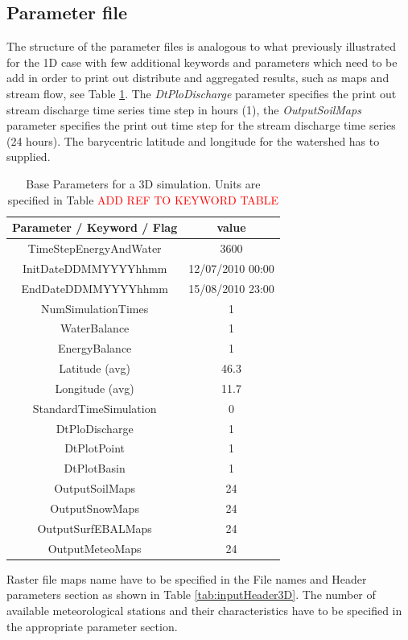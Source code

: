 \subsection{Parameter file}
The structure of the parameter files is analogous to what previously illustrated for the 1D case with few additional keywords and parameters which need to be add in order to print out distribute and aggregated results, such as maps and stream flow, see Table \ref{tab:baseParameters3D}. The { \it DtPloDischarge} parameter specifies the print out stream discharge time series time step in hours (1), the { \it OutputSoilMaps} parameter specifies the print out  time step for the stream discharge time series (24 hours). The barycentric latitude and longitude for the watershed has to supplied.
\begin{table}[h!]
\begin{center}
\begin{tabular}[c]{|c|c|}
\hline
Parameter / Keyword / Flag & value\\
\hline
TimeStepEnergyAndWater& 3600\\
InitDateDDMMYYYYhhmm  & 12/07/2010 00:00 \\
EndDateDDMMYYYYhhmm & 15/08/2010 23:00\\
NumSimulationTimes  & 1\\
WaterBalance & 1\\
EnergyBalance& 1\\
\hline
Latitude (avg) & 46.3 \\
Longitude (avg)& 11.7 \\

StandardTimeSimulation & 0 \\
\hline
DtPloDischarge & 1 \\
DtPlotPoint & 1 \\
DtPlotBasin & 1 \\
\hline
OutputSoilMaps & 24 \\
OutputSnowMaps & 24 \\
OutputSurfEBALMaps & 24 \\
OutputMeteoMaps & 24 \\
\hline
\end{tabular}
\caption{Base Parameters for a 3D simulation. Units are specified in Table \textcolor{red}{ADD REF TO KEYWORD TABLE}}
\label{tab:baseParameters3D}
\end{center}
\end{table}

Raster file maps name have to be specified in the File names and Header parameters section as shown in Table \ref{tab:inputHeader3D}. The number of available meteorological stations and their characteristics have to be specified in the appropriate parameter section. 

